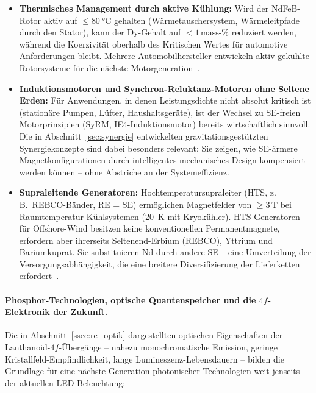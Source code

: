 ﻿\documentclass[12pt, a4paper]{report}
\theoremstyle{definition}
\theoremstyle{remark}
\begin{document}
\begin{itemize}
  \item \textbf{Thermisches Management durch aktive Kühlung:}
    Wird der NdFeB-Rotor aktiv auf $\leq \SI{80}{\celsius}$ gehalten (Wärmetauschersystem,
    Wärmeleitpfade durch den Stator), kann der Dy-Gehalt auf $< 1\,\text{mass-\%}$
    reduziert werden, während die Koerzivität oberhalb des Kritischen Wertes
    für automotive Anforderungen bleibt. Mehrere Automobilhersteller
    entwickeln aktiv gekühlte Rotorsysteme für die nächste
    Motorgeneration~\cite{gutfleisch2011}.

  \item \textbf{Induktionsmotoren und Synchron-Reluktanz-Motoren ohne Seltene Erden:}
    Für Anwendungen, in denen Leistungsdichte nicht absolut kritisch ist
    (stationäre Pumpen, Lüfter, Haushaltsgeräte), ist der Wechsel zu
    SE-freien Motorprinzipien (SyRM, IE4-Induktionsmotor) bereits
    wirtschaftlich sinnvoll. Die in Abschnitt~\ref{sec:synergie}
    entwickelten gravitationsgestützten Synergiekonzepte sind dabei
    besonders relevant: Sie zeigen, wie SE-ärmere Magnetkonfigurationen
    durch intelligentes mechanisches Design kompensiert werden können --
    ohne Abstriche an der Systemeffizienz.

  \item \textbf{Supraleitende Generatoren:}
    Hochtemperatursupraleiter (HTS, z.\,B.\ REBCO-Bänder, RE = SE)
    ermöglichen Magnetfelder von $\geq 3\,\text{T}$ bei Raumtemperatur-Kühlsystemen
    (20~K mit Kryokühler). HTS-Generatoren für Offshore-Wind besitzen keine
    konventionellen Permanentmagnete, erfordern aber ihrerseits Seltenend-Erbium
    (REBCO), Yttrium und Bariumkuprat. Sie substituieren Nd durch andere SE
    -- eine Umverteilung der Versorgungsabhängigkeit, die eine breitere
    Diversifizierung der Lieferketten erfordert~\cite{iea2021}.
\end{itemize}

\paragraph{Phosphor-Technologien, optische Quantenspeicher und die
$4f$-Elektronik der Zukunft.}
Die in Abschnitt~\ref{ssec:re_optik} dargestellten optischen Eigenschaften
der Lanthanoid-$4f$-Übergänge -- nahezu monochromatische Emission, geringe
Kristallfeld-Empfindlichkeit, lange Lumineszenz-Lebensdauern -- bilden die
Grundlage für eine nächste Generation photonischer Technologien weit
jenseits der aktuellen LED-Beleuchtung:
\end{document}
